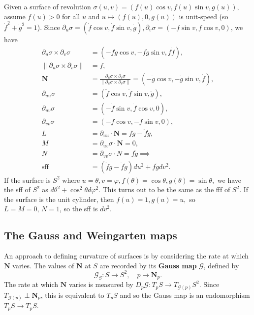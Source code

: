 \begin{example}
    Given a surface of revolution $\sigma(u,v)=(f(u)\cos v, f(u) \sin v, g(u))$, assume $f(u)>0$ for all $u$ and $u \mapsto (f(u),0,g(u))$ is unit-speed (so $\dot f^2+\dot g^2=1$). Since $\partial _u\sigma=(\dot f \cos v, \dot f \sin v, \dot g), \partial _v\sigma=(-f \sin v, f \cos v, 0)$, we have 
    \begin{align*}
        \partial _u\sigma \times \partial _v\sigma&=(-f\dot g \cos v, -f \dot g \sin v, f \dot f),\\
        \|\partial _u\sigma \times  \partial _v\sigma\|&= f,\\
        \mathbf N&=\frac{\partial _u\sigma \times \partial _v\sigma}{\|\partial _u\sigma \times \partial _v\sigma\|}=(-\dot g \cos v, -\dot g \sin v, \dot f),\\
        \partial _{uu}\sigma&=(\ddot f \cos v, \ddot f \sin v, \ddot g),\\
        \partial _{uv}\sigma &=(-\dot f \sin v, \dot f \cos v, 0),\\
        \partial _{vv}\sigma&=(-f \cos v, - f \sin v, 0),\\
        L&=\partial _{uu}\cdot \mathbf N=\dot f \ddot g- \ddot f \dot g,\\
        M&=\partial _{uv}\sigma \cdot \mathbf N=0,\\
        N&=\partial _{vv}\sigma \cdot N=f\dot g \implies \\
        \text{sff} \ &= (\dot f\ddot g -\ddot f \dot g)du ^2+f\dot gdv^2.
    \end{align*}
    If the surface is $S^2$ where $u=\theta,v=\varphi ,f(\theta)=\cos \theta, g(\theta)=\sin \theta,$ we have the sff of $S^2$ as $d\theta ^2+ \cos ^2 \theta d\varphi  ^2$. This turns out to be the same as the fff of $S^2$. If the surface is the unit cylinder, then $f(u)=1,g(u)=u,$ so $L=M=0, \, N=1$, so the sff is $dv^2$.
\end{example}

\subsection{The Gauss and Weingarten maps}
An approach to defining curvature of surfaces is by considering the rate at which $\mathbf N$ varies. The values of $\mathbf N$ at $S$ are recorded by its \textbf{Gauss map} $\mathcal{G} $, defined by \[
\mathcal{G} _S \colon S \to S^2, \quad p \mapsto \mathbf N_p.
\] The rate at which $\mathbf N$ varies is measured by $D_p \mathcal{G} \colon T_p S \to T_{\mathcal{G} (p)}S^2$. Since $T_{\mathcal{G} (p)}\perp \mathbf N_p$, this is equivalent to $T_p S$ and so the Gauss map is an endomorphism $T_p S\to T_p S$.

